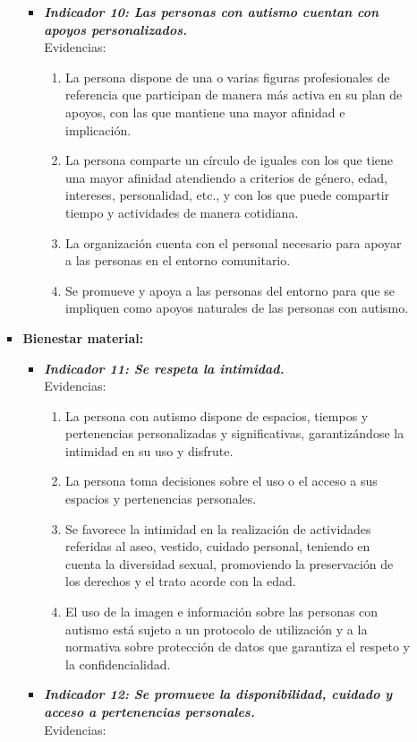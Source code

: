 \begin{itemize}
\begin{itemize}
\begin{itemize}
\begin{itemize}
\begin{enumerate}
				\end{enumerate}
				\item \textbf{\textit{Indicador 10: Las personas con autismo cuentan con apoyos personalizados.}}\\Evidencias:
				\begin{enumerate}
					\item La persona dispone de una o varias figuras profesionales de referencia que participan de manera más activa en su plan de apoyos, con las que mantiene una mayor afinidad e implicación. 
					\item La persona comparte un círculo de iguales con los que tiene una mayor afinidad atendiendo a criterios de género, edad, intereses, personalidad, etc., y con los que puede compartir tiempo y actividades de manera cotidiana. 
					\item La organización cuenta con el personal necesario para apoyar a las personas en el entorno comunitario.  
					\item Se promueve y apoya a las personas del entorno para que se impliquen como apoyos naturales de las personas con autismo. 
					
				\end{enumerate}
			\end{itemize}
			\item \textbf{Bienestar material:}
			\begin{itemize}
				\item \textbf{\textit{Indicador 11: Se respeta la intimidad.}}\\Evidencias:
				\begin{enumerate}
					\item La persona con autismo dispone de espacios, tiempos y pertenencias personalizadas y significativas, garantizándose la intimidad en su uso y disfrute. 
					\item La persona toma decisiones sobre el uso o el acceso a sus espacios y pertenencias personales. 
					\item Se favorece la intimidad en la realización de actividades referidas al aseo, vestido, cuidado personal, teniendo en cuenta la diversidad sexual, promoviendo la preservación de los derechos y el trato acorde con la edad. 
					\item El uso de la imagen e información sobre las personas con autismo está sujeto a un protocolo de utilización y a la normativa sobre protección de datos que garantiza el respeto y la confidencialidad. 
					 
				\end{enumerate}
				\item \textbf{\textit{Indicador 12: Se promueve la disponibilidad, cuidado y acceso a pertenencias personales.}}\\Evidencias:
				

\end{itemize}
\end{itemize}
\end{itemize}
\end{itemize}
